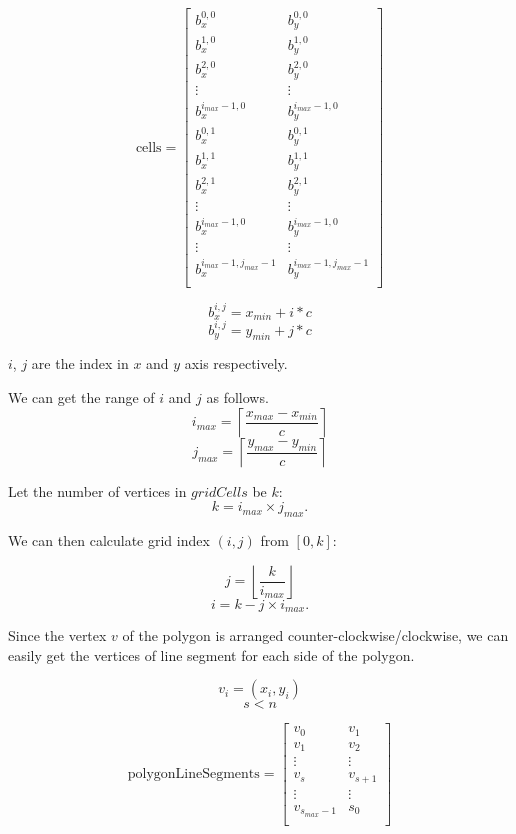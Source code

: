 $$\text{cells} =\begin{bmatrix}
b^{0,0}_x & b^{0,0}_y \\
b^{1,0}_x & b^{1,0}_y \\
b^{2,0}_x & b^{2,0}_y \\
\vdots & \vdots \\
b^{i_{max} - 1,0}_x & b^{i_{max} - 1,0}_y \\
b^{0,1}_x & b^{0,1}_y \\
b^{1,1}_x & b^{1,1}_y \\
b^{2,1}_x & b^{2,1}_y \\
\vdots & \vdots \\
b^{i_{max} - 1,0}_x & b^{i_{max} - 1,0}_y \\
\vdots & \vdots \\
b^{i_{max} - 1,j_{max}-1}_x & b^{i_{max} - 1,j_{max} - 1}_y \\
\end{bmatrix}$$

$$b^{i,j}_x = x_{min} + i * c$$
$$b^{i,j}_y = y_{min} + j * c$$

$i$, $j$ are the index in $x$  and $y$ axis respectively.


We can get the range of $i$ and $j$ as follows.
$$i_{max} = \left\lceil\frac{x_{max} - x_{min}}{c}\right\rceil $$
$$j_{max} = \left\lceil\frac{y_{max} - y_{min}}{c}\right\rceil$$

Let the number of vertices in $gridCells$ be $k$:
$$ k = i_{max} \times j_{max}.$$


We can then calculate grid index $(i,j)$ from $[0, k]$:

$$j = \left\lfloor\frac{k}{i_{max}}\right\rfloor$$
$$i = k  - j \times i_{max}.$$



Since the vertex $v$ of the polygon is arranged counter-clockwise/clockwise, we can easily get the vertices of line segment for each side of the polygon.

$$v_i = (x_i, y_i)$$
$$s < n$$

$$\text{polygonLineSegments}=\begin{bmatrix}
v_0 & v_1 \\
v_1 & v_2 \\
\vdots & \vdots \\
v_s & v_{s+1} \\
\vdots & \vdots \\
v_{s_{max}-1} & s_0 \\
\end{bmatrix}$$

